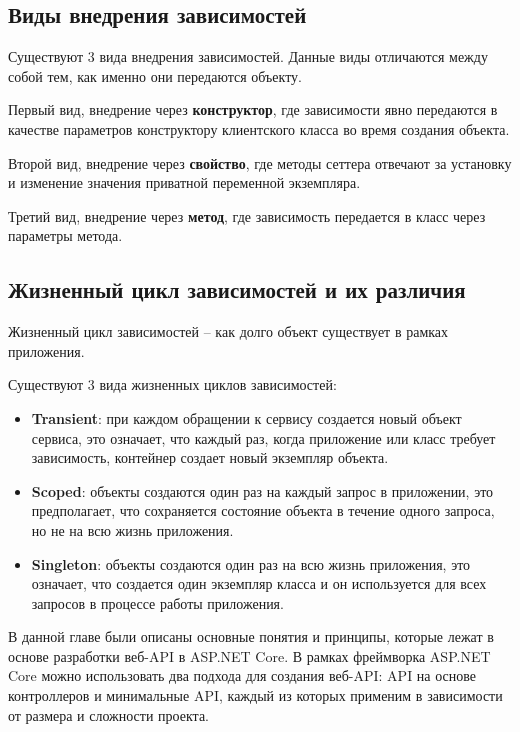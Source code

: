 \documentclass[a4paper,12pt]{report}
\begin{document}
\subsection{Виды внедрения зависимостей}

Существуют 3 вида внедрения зависимостей. Данные виды отличаются между собой тем, как именно они передаются объекту.

Первый вид, внедрение через \textbf{конструктор}, где зависимости явно передаются в качестве параметров конструктору клиентского класса во время создания объекта.

Второй вид, внедрение через \textbf{свойство}, где методы сеттера отвечают за установку и изменение значения приватной переменной экземпляра.

Третий вид, внедрение через \textbf{метод}, где зависимость передается в класс через параметры метода.

\subsection{Жизненный цикл зависимостей и их различия}

Жизненный цикл зависимостей -- как долго объект существует в рамках приложения. 

Существуют 3 вида жизненных циклов зависимостей:
\begin{itemize}
    \item
        \textbf{Transient}: при каждом обращении к сервису создается новый объект сервиса, это означает, что каждый раз, 
        когда приложение или класс требует зависимость, контейнер создает новый экземпляр объекта.
    \item
        \textbf{Scoped}: объекты создаются один раз на каждый запрос в приложении, это предполагает, 
        что сохраняется состояние объекта в течение одного запроса, но не на всю жизнь приложения.
    \item
        \textbf{Singleton}:  объекты создаются один раз на всю жизнь приложения, это означает, 
        что создается один экземпляр класса и он используется для всех запросов в процессе работы приложения. 
\end{itemize}


В данной главе были описаны основные понятия и принципы, которые лежат в основе разработки веб-\acs{API} в ASP.NET Core. 
В рамках фреймворка ASP.NET Core можно использовать два подхода для создания веб-\acs{API}: \acs{API} на основе контроллеров и минимальные \acs{API}, 
каждый из которых применим в зависимости от размера и сложности проекта.
\end{document}

